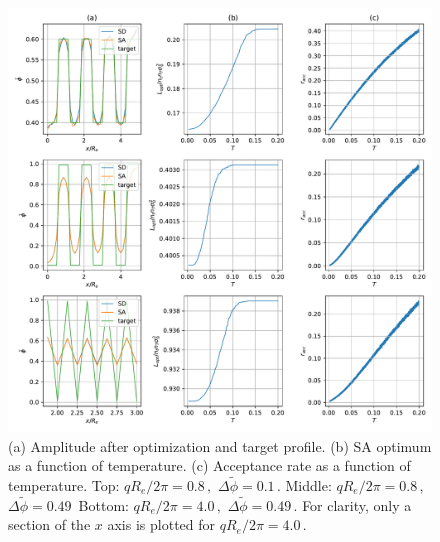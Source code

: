 \documentclass[bachelor,       %
               twoside,        %
               BCOR10mm,       %
               ngerman, english %
               ]{GAUBM}
\begin{document}
\begin{figure}[htbp]
    \centering
    \includegraphics[width=\linewidth]{Thesis/figures/comparison_sd_sa.pdf}
    \caption{(a) Amplitude after optimization and target profile. (b) \ac{SA} optimum as a function of temperature. (c) Acceptance rate as a function of temperature. Top: $qR_e/2\pi=0.8\,,$ $\Delta\tilde\phi=0.1\,.$ Middle: $qR_e/2\pi=0.8\,,$ $\Delta\tilde\phi=0.49\,$ Bottom: $qR_e/2\pi=4.0\,,$ $\Delta\tilde\phi=0.49\,.$ For clarity, only a section of the $x$ axis is plotted for $qR_e/2\pi=4.0\,.$}
    \label{fig:comparison_sd_sa}
\end{figure}





\end{document}
